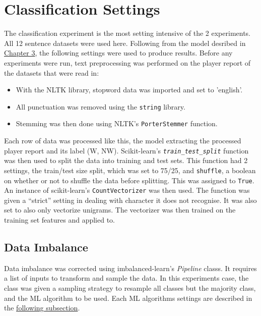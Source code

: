 \documentclass[oneside,12pt]{Classes/RoboticsLaTeX}
\begin{document}
\section{Classification Settings}
The classification experiment is the most setting intensive of the 2 experiments. All 12 sentence datasets were used here. Following from the model desribed in \hyperref[chap:methodology]{Chapter 3},
the following settings were used to produce results. Before any experiments were run, text preprocessing was performed on the player report of the datasets that were read in:
\begin{itemize}
  \item With the NLTK library, stopword data was imported and set to 'english'.
  \item All punctuation was removed using the \texttt{string} library.
  \item Stemming was then done using NLTK's \texttt{PorterStemmer} function.
\end{itemize}
Each row of data was processed like this, the model extracting the processed player report and its label (W, NW). Scikit-learn's \texttt{{\it train{\_}test{\_}split}} function was then used to split the data into training
and test sets. This function had 2 settings, the train/test size split, which was set to 75/25, and \texttt{shuffle}, a boolean on whether or not to shuffle the data before splitting. This was assigned to \texttt{True}.
An instance of scikit-learn's \texttt{CountVectorizer} was then used. The function was given a ``strict'' setting in dealing with character it does not recognise. It was also set to also only vectorize unigrams. The vectorizer
was then trained on the training set features and applied to.
\subsection{Data Imbalance}
Data imbalance was corrected using imbalanced-learn's {\it Pipeline} classs. It requires a list of inputs to transform and sample the data. In this experiments case, the class was given a sampling strategy to resample all classes but the majority class,
and the ML algorithm to be used. Each ML algorithms settings are described in the \hyperref[sec:algor]{following subsection}.
\end{document}
